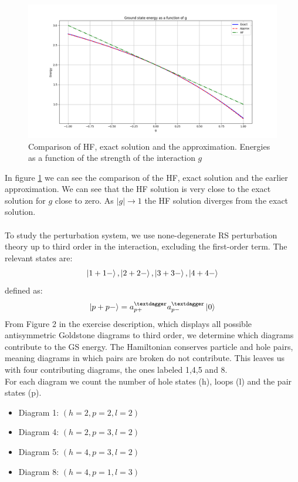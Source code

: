 \documentclass[a4paper,12pt]{article}
\begin{document}
\begin{figure}[h!]
    \centering
    \includegraphics[scale = 0.5]{Figure_6.png}
    \caption{Comparison of HF, exact solution and the approximation.
    Energies as a function of the strength of the interaction $g$}
    \label{fig:fig6}
\end{figure}
In figure \ref{fig:fig6} we can see the comparison of the HF, exact solution and the earlier approximation. We can see that the HF solution is very close to the exact solution for $g$ close to zero. As $|g|\rightarrow 1$ the HF solution diverges from the exact solution. \\ \\
To study the perturbation system, we use none-degenerate RS perturbation theory up to third order in the interaction, excluding the first-order term. The relevant states are:
$$
\ket{1+1-}, \ket{2+2-}, \ket{3+3-}, \ket{4+4-}
$$
defined as:
$$
\ket{p+p -} = a_{p+}^{†} a_{p-}^{†} \ket{0}
$$
From Figure 2 in the exercise description, which displays all possible antisymmetric Goldstone diagrams to third order, we determine which diagrams contribute to the GS energy. The Hamiltonian conserves particle and hole pairs, meaning diagrams in which pairs are broken do not contribute. This leaves us with four contributing diagrams, the ones labeled 1,4,5 and 8.\\
For each diagram we count the number of hole states (h), loops (l) and the pair states (p). 
\begin{itemize}
    \item Diagram 1: $(h=2,p=2,l=2)$
    \item Diagram 4: $(h=2,p=3,l=2)$
    \item Diagram 5: $(h=4,p=3,l=2)$
    \item Diagram 8: $(h=4,p=1,l=3)$
\end{itemize}
\end{document}

